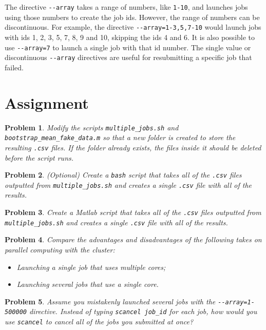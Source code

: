 \documentclass[12pt, a4paper]{article}
\newtheorem{problem}{Problem}
\begin{document}
The directive \texttt{-{}-array} takes a range of numbers, like \texttt{1-10}, and launches jobs using those numbers to create the job ids.
However, the range of numbers can be discontinuous.
For example, the directive \texttt{-{}-array=1-3,5,7-10} would launch jobs with ids 1, 2, 3, 5, 7, 8, 9 and 10, skipping the ids 4 and 6.
It is also possible to use \texttt{-{}-array=7} to launch a single job with that id number.
The single value or discontinuous \texttt{-{}-array} directives are useful for resubmitting a specific job that failed.

\section{Assignment}
\label{sec:orgdc5b5cd}
\begin{problem}
Modify the scripts \texttt{multiple\_jobs.sh} and \texttt{bootstrap\_mean\_fake\_data.m} so that a new folder is created to store the resulting \texttt{.csv} files.
If the folder already exists, the files inside it should be deleted before the script runs.
\end{problem}

\begin{problem}
(Optional) Create a \texttt{bash} script that takes all of the \texttt{.csv} files outputted from \texttt{multiple\_jobs.sh} and creates a single \texttt{.csv} file with all of the results.
\end{problem}

\begin{problem}
Create a Matlab script that takes all of the \texttt{.csv} files outputted from \texttt{multiple\_jobs.sh} and creates a single \texttt{.csv} file with all of the results.
\end{problem}

\begin{problem}
Compare the advantages and disadvantages of the following takes on parallel computing with the cluster:
\begin{itemize}
\item Launching a single job that uses multiple cores;
\item Launching several jobs that use a single core.
\end{itemize}
\end{problem}

\begin{problem}
Assume you mistakenly launched several jobs with the \texttt{-{}-array=1-500000} directive. Instead of typing \texttt{scancel job\_id} for each job, how would you use \texttt{scancel} to cancel all of the jobs you submitted at once?
\end{problem}
\end{document}
